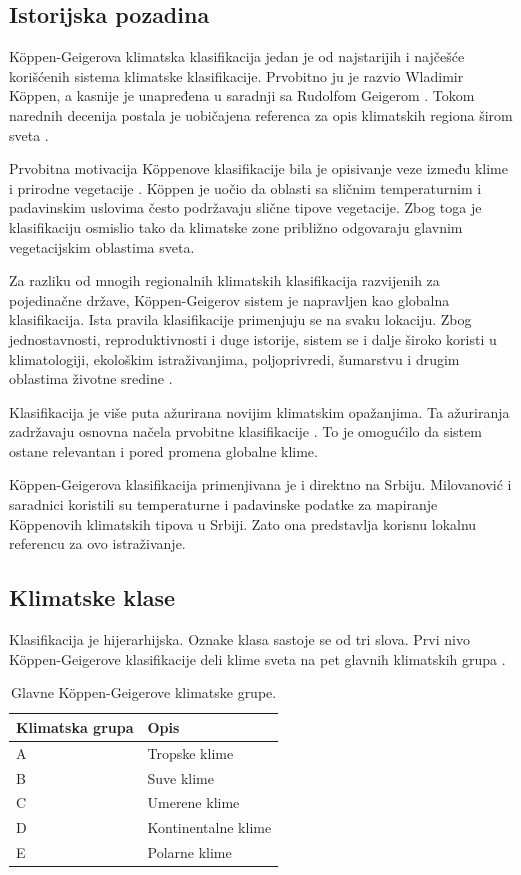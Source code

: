 \documentclass[11pt]{article}
\begin{document}
\subsection{Istorijska pozadina}

Köppen-Geigerova klimatska klasifikacija jedan je od najstarijih i najčešće korišćenih sistema klimatske klasifikacije. Prvobitno ju je razvio Wladimir Köppen, a kasnije je unapređena u saradnji sa Rudolfom Geigerom \cite{koppen1936,peel2007}. Tokom narednih decenija postala je uobičajena referenca za opis klimatskih regiona širom sveta \cite{peel2007,beck2018}.

Prvobitna motivacija Köppenove klasifikacije bila je opisivanje veze između klime i prirodne vegetacije \cite{koppen1936,peel2007}. Köppen je uočio da oblasti sa sličnim temperaturnim i padavinskim uslovima često podržavaju slične tipove vegetacije. Zbog toga je klasifikaciju osmislio tako da klimatske zone približno odgovaraju glavnim vegetacijskim oblastima sveta.

Za razliku od mnogih regionalnih klimatskih klasifikacija razvijenih za pojedinačne države, Köppen-Geigerov sistem je napravljen kao globalna klasifikacija. Ista pravila klasifikacije primenjuju se na svaku lokaciju. Zbog jednostavnosti, reproduktivnosti i duge istorije, sistem se i dalje široko koristi u klimatologiji, ekološkim istraživanjima, poljoprivredi, šumarstvu i drugim oblastima životne sredine \cite{peel2007,beck2018}.

Klasifikacija je više puta ažurirana novijim klimatskim opažanjima. Ta ažuriranja zadržavaju osnovna načela prvobitne klasifikacije \cite{peel2007,beck2018}. To je omogućilo da sistem ostane relevantan i pored promena globalne klime.

Köppen-Geigerova klasifikacija primenjivana je i direktno na Srbiju. Milovanović i saradnici \cite{milovanovic2017} koristili su temperaturne i padavinske podatke za mapiranje Köppenovih klimatskih tipova u Srbiji. Zato ona predstavlja korisnu lokalnu referencu za ovo istraživanje.

\subsection{Klimatske klase}

Klasifikacija je hijerarhijska. Oznake klasa sastoje se od tri slova. Prvi nivo Köppen-Geigerove klasifikacije deli klime sveta na pet glavnih klimatskih grupa \cite{koppen1936,peel2007}.

\begin{table}[h]
\centering
\begin{tabular}{ll}
\hline
\textbf{Klimatska grupa} & \textbf{Opis} \\
\hline
A & Tropske klime \\
B & Suve klime \\
C & Umerene klime \\
D & Kontinentalne klime \\
E & Polarne klime \\
\hline
\end{tabular}
\caption{Glavne Köppen-Geigerove klimatske grupe.}
\end{table}
\end{document}
